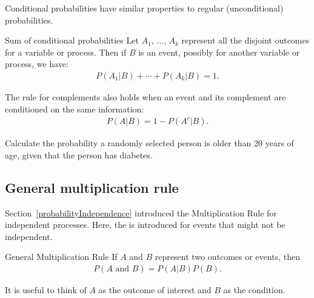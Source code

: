 Conditional probabilities have similar properties to regular (unconditional) probabilities.

\begin{onebox}{Sum of conditional probabilities}
Let $A_1$, ..., $A_k$ represent all the disjoint outcomes for a variable or process. Then if $B$ is an event, possibly for another variable or process, we have: \vspace{-1mm}
\begin{align*}
P(A_1|B)+\cdots+P(A_k|B) = 1.
\end{align*}\vspace{-5.5mm} \par
The rule for complements also holds when an event and its complement are conditioned on the same information: \vspace{-1.5mm}
\begin{align*}
P(A | B) = 1 - P(A^c | B).
\end{align*}
\end{onebox}

\begin{exercisewrap}
\begin{nexercise} 
Calculate the probability a randomly selected person is older than 20 years of age, given that the person has diabetes.\footnotemark{}
\end{nexercise}
\end{exercisewrap}


\textD{\newpage}


\subsection{General multiplication rule}

Section~\ref{probabilityIndependence} introduced the Multiplication Rule for independent processes. Here, the  is introduced for events that might not be independent.

\begin{onebox}{General Multiplication Rule}
If $A$ and $B$ represent two outcomes or events, then \vspace{-1.5mm}
\begin{eqnarray*}
P(A\text{ and }B) = P(A | B) P(B).
\end{eqnarray*} \vspace{-6.5mm} \par
It is useful to think of $A$ as the outcome of interest and $B$ as the condition.
\end{onebox}

